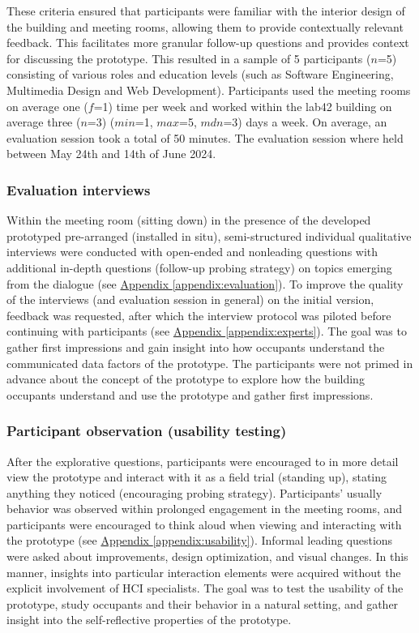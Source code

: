 These criteria ensured that participants were familiar with the interior design of the building and meeting rooms, allowing them to provide contextually relevant feedback. This facilitates more granular follow-up questions and provides context for discussing the prototype. This resulted in a sample of 5 participants ($n$=5) consisting of various roles and education levels (such as Software Engineering, Multimedia Design and Web Development). Participants used the meeting rooms on average one ($f$=1) time per week and worked within the lab42 building on average three ($n$=3) ($min$=1, $max$=5, $mdn$=3) days a week. On average, an evaluation session took a total of 50 minutes. The evaluation session where held between May 24th and 14th of June 2024. 

\subsubsection{Evaluation interviews}

Within the meeting room (sitting down) in the presence of the developed prototyped pre-arranged (installed in situ), semi-structured individual qualitative interviews were conducted with open-ended and nonleading questions with additional in-depth questions (follow-up probing strategy) on topics emerging from the dialogue (see \hyperref[appendix:evaluation]{Appendix \ref*{appendix:evaluation}}). To improve the quality of the interviews (and evaluation session in general) on the initial version, feedback was requested, after which the interview protocol was piloted before continuing with participants (see \hyperref[appendix:experts]{Appendix \ref*{appendix:experts}}). The goal was to gather first impressions and gain insight into how occupants understand the communicated data factors of the prototype. The participants were not primed in advance about the concept of the prototype to explore how the building occupants understand and use the prototype and gather first impressions.

\subsubsection{Participant observation (usability testing)}

After the explorative questions, participants were encouraged to in more detail view the prototype and interact with it as a field trial (standing up), stating anything they noticed (encouraging probing strategy). Participants' usually behavior was observed within prolonged engagement in the meeting rooms, and participants were encouraged to think aloud when viewing and interacting with the prototype (see \hyperref[appendix:usability]{Appendix \ref*{appendix:usability}}). Informal leading questions were asked about improvements, design optimization, and visual changes. In this manner, insights into particular interaction elements were acquired without the explicit involvement of HCI specialists. The goal was to test the usability of the prototype, study occupants and their behavior in a natural setting, and gather insight into the self-reflective properties of the prototype. 

